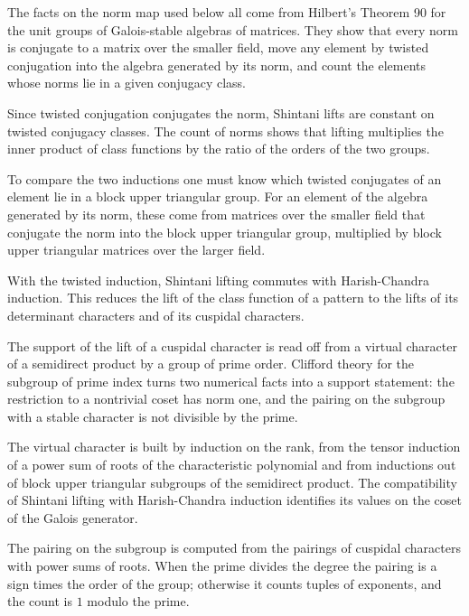 The facts on the norm map used below all come from Hilbert's Theorem 90 for the unit groups of Galois-stable
algebras of matrices. They show that every norm is conjugate to a matrix over the smaller field, move any
element by twisted conjugation into the algebra generated by its norm, and count the elements whose norms
lie in a given conjugacy class.

Since twisted conjugation conjugates the norm, Shintani lifts are constant on twisted conjugacy classes. The
count of norms shows that lifting multiplies the inner product of class functions by the ratio of the orders
of the two groups.

To compare the two inductions one must know which twisted conjugates of an element lie in a block upper
triangular group. For an element of the algebra generated by its norm, these come from matrices over the
smaller field that conjugate the norm into the block upper triangular group, multiplied by block upper
triangular matrices over the larger field.

With the twisted induction, Shintani lifting commutes with Harish-Chandra induction. This reduces the lift
of the class function of a pattern to the lifts of its determinant characters and of its cuspidal
characters.

The support of the lift of a cuspidal character is read off from a virtual character of a semidirect product
by a group of prime order. Clifford theory for the subgroup of prime index turns two numerical facts into a
support statement: the restriction to a nontrivial coset has norm one, and the pairing on the subgroup with a
stable character is not divisible by the prime.

The virtual character is built by induction on the rank, from the tensor induction of a power sum of roots
of the characteristic polynomial and from inductions out of block upper triangular subgroups of the
semidirect product. The compatibility of Shintani lifting with Harish-Chandra induction identifies its
values on the coset of the Galois generator.

The pairing on the subgroup is computed from the pairings of cuspidal characters with power sums of roots.
When the prime divides the degree the pairing is a sign times the order of the group; otherwise it counts
tuples of exponents, and the count is $1$ modulo the prime.

